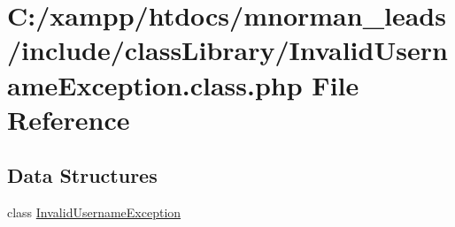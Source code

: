 \hypertarget{_invalid_username_exception_8class_8php}{\section{C\-:/xampp/htdocs/mnorman\-\_\-leads/include/class\-Library/\-Invalid\-Username\-Exception.class.\-php File Reference}
\label{_invalid_username_exception_8class_8php}
}
\subsection*{Data Structures}
\begin{DoxyCompactItemize}
\item 
class \hyperlink{class_invalid_username_exception}{Invalid\-Username\-Exception}
\end{DoxyCompactItemize}
